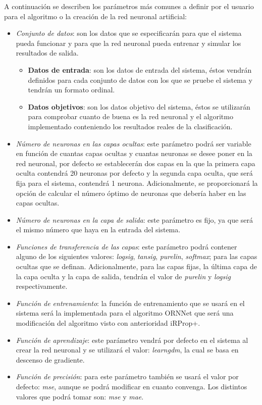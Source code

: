		A continuación se describen los parámetros más comunes a definir por el usuario para el algoritmo o la creación de la red neuronal artificial:
		
		\begin{itemize}
			\item \textit{Conjunto de datos}: son los datos que se especificarán para que el sistema pueda funcionar y para que la red neuronal pueda entrenar y simular los resultados de salida.
			\begin{itemize}
				\item \textbf{Datos de entrada}: son los datos de entrada del sistema, éstos vendrán definidos para cada conjunto de datos con los que se pruebe el sistema y tendrán un formato ordinal.
				\item \textbf{Datos objetivos}: son los datos objetivo del sistema, éstos se utilizarán para comprobar cuanto de buena es la red neuronal y el algoritmo implementado conteniendo los resultados reales de la clasificación.
			\end{itemize}
			\item \textit{Número de neuronas en las capas ocultas}: este parámetro podrá ser variable en función de cuantas capas ocultas y cuantas neuronas se desee poner en la red neuronal, por defecto se establecerán dos capas en la que la primera capa oculta contendrá 20 neuronas por defecto y la segunda capa oculta, que será fija para el sistema, contendrá 1 neurona. Adicionalmente, se proporcionará la opción de calcular el número óptimo de neuronas que debería haber en las capas ocultas.
			\item \textit{Número de neuronas en la capa de salida}: este parámetro es fijo, ya que será el mismo número que haya en la entrada del sistema.
			\item \textit{Funciones de transferencia de las capas}: este parámetro podrá contener alguno de los siguientes valores: \textit{logsig}, \textit{tansig}, \textit{purelin}, \textit{softmax}; para las capas ocultas que se definan. Adicionalmente, para las capas fijas, la última capa de la capa oculta y la capa de salida, tendrán el valor de \textit{purelin} y \textit{logsig} respectivamente.
			\item \textit{Función de entrenamiento}: la función de entrenamiento que se usará en el sistema será la implementada para el algoritmo ORNNet que será una modificación del algoritmo visto con anterioridad iRProp+.
			\item \textit{Función de aprendizaje}: este parámetro vendrá por defecto en el sistema al crear la red neuronal y se utilizará el valor: \textit{learngdm}, la cual se basa en descenso de gradiente.
			\item \textit{Función de precisión}: para este parámetro también se usará el valor por defecto: \textit{mse}, aunque se podrá modificar en cuanto convenga. Los distintos valores que podrá tomar son: \textit{mse} y \textit{mae}.
		\end{itemize}

